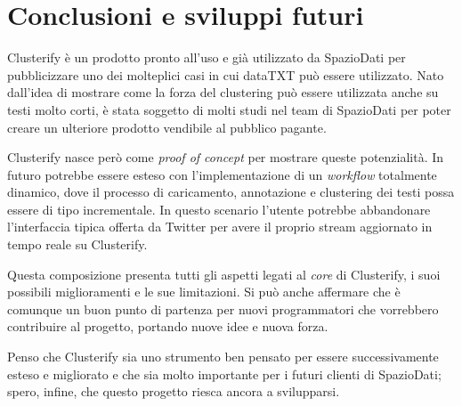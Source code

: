 \chapter{Conclusioni e sviluppi futuri}
	Clusterify è un prodotto pronto all'uso e già utilizzato da SpazioDati per pubblicizzare  uno dei molteplici casi in cui dataTXT può essere utilizzato. Nato dall'idea di mostrare come la forza del clustering può essere utilizzata anche su testi molto corti, è stata soggetto di molti studi nel team di SpazioDati per poter creare un ulteriore prodotto vendibile al pubblico pagante.

	Clusterify nasce però come \emph{proof of concept} per mostrare queste potenzialità. In futuro potrebbe essere esteso con l'implementazione di un \emph{workflow} totalmente dinamico, dove il processo di caricamento, annotazione e clustering dei testi possa essere di tipo incrementale. In questo scenario l'utente potrebbe abbandonare l'interfaccia tipica offerta da Twitter per avere il proprio stream aggiornato in tempo reale su Clusterify.

	Questa composizione presenta tutti gli aspetti legati al \emph{core} di Clusterify, i suoi possibili miglioramenti e le sue limitazioni. Si può anche affermare che è comunque un buon punto di partenza per nuovi programmatori che vorrebbero contribuire al progetto, portando nuove idee e nuova forza.

	Penso che Clusterify sia uno strumento ben pensato per essere successivamente esteso e migliorato e che sia molto importante per i futuri clienti di SpazioDati; spero, infine, che questo progetto riesca ancora a svilupparsi.